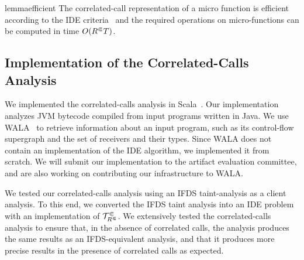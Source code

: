 \begin{restatable}{lemma}{efficient}\label{lem:efficient}
  The correlated-call representation of a micro function is efficient according to the IDE criteria~\cite{sagiv1996precise} and the required operations
  on micro-functions can be computed in time $O({R^\Subset} T)$.
\end{restatable}


\subsection{Implementation of the Correlated-Calls Analysis}

We implemented the correlated-calls analysis in Scala~\cite{odersky2004overview}. 
Our implementation analyzes JVM bytecode compiled from input programs written
in Java.
%
We use WALA~\cite{fink2012wala} to retrieve information about an input program, such 
as its control-flow supergraph and the set of receivers and their types.
Since WALA does not contain an implementation of the IDE algorithm,
we implemented it from scratch.
We will submit our implementation to the artifact evaluation committee, and are also 
working on contributing our infrastructure to WALA. 
 
We tested our correlated-calls analysis using an IFDS taint-analysis  
as a client analysis. To this end, we converted the IFDS taint analysis into an IDE problem with an 
implementation of $\mathcal T^\Subset_{R^\Subset}$. We extensively tested the correlated-calls analysis to ensure that, in 
the absence of correlated calls, the analysis produces the same results as an IFDS-equivalent analysis, and that 
it produces more precise results in the presence of correlated calls as expected.

